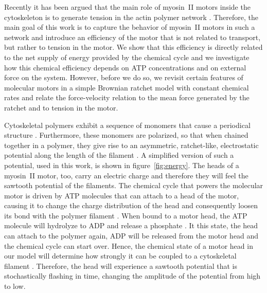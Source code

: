 \documentclass[aps,pre,twocolumn,showpacs,showkeys,superscriptaddress,floatfix]{revtex4-1}
\begin{document}
Recently it has been argued that the main role of myosin~II motors inside the cytoskeleton is to generate tension in the actin polymer network \cite{ma2012nonmuscle,chugh2017actin,monier2010actomyosin}.
Therefore, the main goal of this work is to capture the behavior of myosin~II motors in such a network 
and introduce an efficiency of the motor that is not related to transport, but rather to tension in the motor.
We show that this efficiency is directly related to the net supply of energy provided by the chemical cycle 
and we investigate how this chemical efficiency depends on ATP concentrations and on external force on the system.
However, before we do so, we revisit certain features of molecular motors in a simple Brownian ratchet model \cite{reimann2002brownian} with constant chemical rates and relate the force-velocity relation to the mean force generated by the ratchet and to tension in the motor.

Cytoskeletal polymers exhibit a sequence of monomers that cause a periodical structure \cite{yogurtcu2012mechanochemical}. 
Furthermore, these monomers are polarized, so that when chained together in a polymer, they give rise to an asymmetric, ratchet-like, electrostatic potential along the length of the filament \cite{Nie2014,nie2014conformational}. 
A simplified version of such a potential, used in this work, is shown in figure~\ref{fig:energy}. 
The heads of a myosin~II motor, too, carry an electric charge \cite{barterls1993myosin} and therefore they will feel the sawtooth potential of the filaments. %
The chemical cycle that powers the molecular motor is driven by ATP molecules that can attach to a head of the motor, causing it to change the charge distribution of the head and consequently loosen its bond with the polymer filament \cite{adelstein1980regulation}. 
When bound to a motor head, the ATP molecule will hydrolyze to ADP and release a phosphate \cite{gajewski1986thermodynamics}. 
It this state, the head can attach to the polymer again, ADP will be released from the motor head and the chemical cycle can start over. 
Hence, the chemical state of a motor head in our model will determine how strongly it can be coupled to a cytoskeletal filament \cite{Nie2014,nie2014conformational}. 
Therefore, the head will experience a sawtooth potential that is stochastically flashing in time, changing the amplitude of the potential from high to low.
\end{document}
